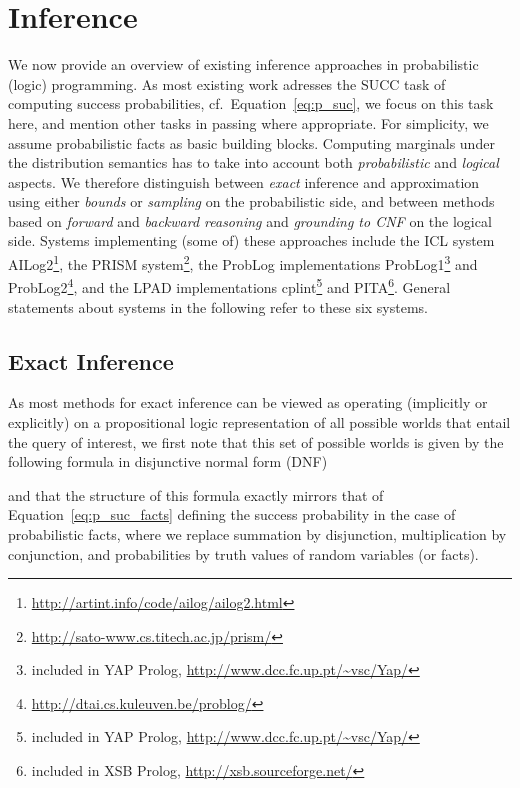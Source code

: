 \documentclass[a4paper]{article}
\begin{document}
\section{Inference}
\label{sec:inference} 
We now provide an overview of existing inference approaches in
probabilistic (logic) programming. As most existing work adresses the
SUCC task of computing success probabilities, 
cf.~Equation~\eqref{eq:p_suc}, we focus on this task here, and mention
other tasks in passing where appropriate. For simplicity, we assume
probabilistic facts as basic building blocks. 
Computing marginals under the distribution semantics has to take
into account both \emph{probabilistic} and \emph{logical} aspects. We
therefore distinguish between \emph{exact}
inference and approximation using either \emph{bounds} or
\emph{sampling} on the probabilistic side, and between methods based
on \emph{forward} and \emph{backward reasoning} and \emph{grounding to
CNF} on the logical side. 
Systems implementing (some of) these approaches include the ICL system
AILog2\footnote{\url{http://artint.info/code/ailog/ailog2.html}}, the 
PRISM system\footnote{\url{http://sato-www.cs.titech.ac.jp/prism/}\label{foot:prism}}, the
ProbLog implementations 
ProbLog1\footnote{included in YAP Prolog,
  \url{http://www.dcc.fc.up.pt/~vsc/Yap/}\label{foot:p1}} and
ProbLog2\footnote{\url{http://dtai.cs.kuleuven.be/problog/}\label{foot:p2}}, and the LPAD implementations cplint\footnote{included in YAP Prolog,
  \url{http://www.dcc.fc.up.pt/~vsc/Yap/}} and PITA\footnote{included
  in XSB Prolog, \url{http://xsb.sourceforge.net/}}. General
statements about systems in the following refer to these six systems.

\subsection{Exact Inference}\label{sec:exact}
As most methods for exact inference can be viewed as operating
(implicitly or explicitly) on a propositional logic representation of
all possible worlds that entail the query  of interest, we first note
that this set of possible worlds is given by the following 
formula in disjunctive normal form (DNF)
  
and that the structure of this formula exactly mirrors that of
Equation~\eqref{eq:p_suc_facts} defining  the
success probability in the case of probabilistic facts, where we replace summation by disjunction,
multiplication by conjunction, and probabilities by truth values of
random variables (or facts).  
\end{document}
